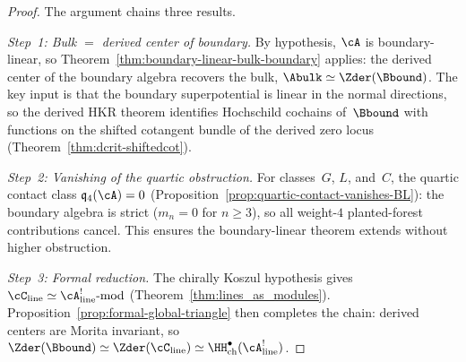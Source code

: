 \begin{proof}
The argument chains three results.

\emph{Step~1: Bulk $=$ derived center of boundary.}
By hypothesis, $\cA$ is boundary-linear, so
Theorem~\ref{thm:boundary-linear-bulk-boundary} applies:
the derived center of the boundary algebra recovers the bulk,
$\Abulk \simeq \Zder(\Bbound)$.
The key input is that the boundary superpotential is linear in
the normal directions, so the derived HKR theorem identifies
Hochschild cochains of~$\Bbound$ with functions on the shifted
cotangent bundle of the derived zero locus
(Theorem~\ref{thm:dcrit-shiftedcot}).

\emph{Step~2: Vanishing of the quartic obstruction.}
For classes~$G$, $L$, and~$C$, the quartic contact class
$\mathfrak{q}_4(\cA) = 0$
(Proposition~\ref{prop:quartic-contact-vanishes-BL}): the
boundary algebra is strict ($m_n = 0$ for $n \geq 3$), so all
weight-$4$ planted-forest contributions cancel.
This ensures the boundary-linear theorem extends without
higher obstruction.

\emph{Step~3: Formal reduction.}
The chirally Koszul hypothesis gives
$\cC_{\mathrm{line}} \simeq
\cA^!_{\mathrm{line}}\text{-}\mathrm{mod}$
(Theorem~\ref{thm:lines_as_modules}).
Proposition~\ref{prop:formal-global-triangle} then completes
the chain: derived centers are Morita invariant, so
$\Zder(\Bbound) \simeq \Zder(\cC_{\mathrm{line}})
\simeq \HH^\bullet_{\mathrm{ch}}(\cA^!_{\mathrm{line}})$.
\end{proof}

